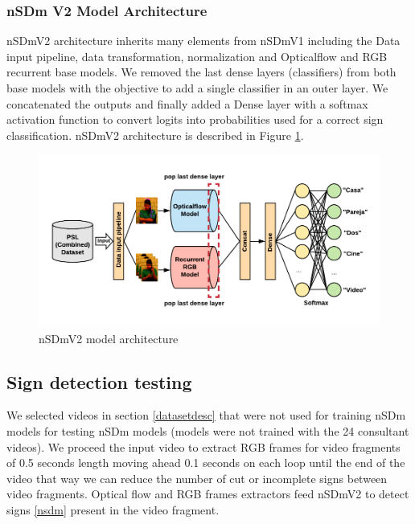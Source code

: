\documentclass[twocolumn,conference]{article}
\begin{document}
\subsubsection{nSDm V2 Model Architecture}\label{nsdmv2-architecture}

nSDmV2 architecture inherits many elements from nSDmV1 including the Data input pipeline, data transformation, normalization and Opticalflow and RGB recurrent base models. We removed the last dense layers (classifiers) from both base models with the objective to add a single classifier in an outer layer. We concatenated the outputs and finally added a Dense layer with a softmax activation function to convert logits into probabilities used for a correct sign classification. nSDmV2 architecture is described in Figure \ref{fig:ndsm-v2-architecture}.

\begin{figure}[hbt!]
\centering
\includegraphics[scale=1.0]{images/nsdm-model-architecture-v2.png}
\caption{nSDmV2 model architecture}
\label{fig:ndsm-v2-architecture}
\end{figure}

\subsection{Sign detection testing}\label{new-videos-testing}
We selected videos in section \ref{datasetdesc} that were not used for training nSDm models for testing nSDm models (models were not trained with the 24 consultant videos). We proceed the input video to extract RGB frames for video fragments of 0.5 seconds length moving ahead 0.1 seconds on each loop until the end of the video that way we can reduce the number of cut or incomplete signs between video fragments. Optical flow and RGB frames extractors feed nSDmV2 to detect signs \ref{nsdm} present in the video fragment.
\end{document}
